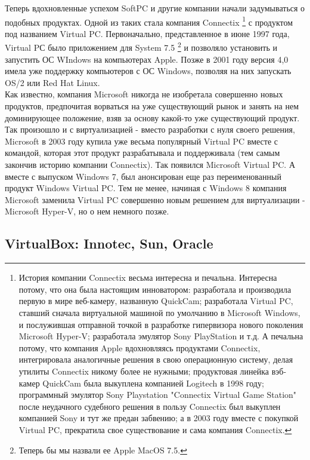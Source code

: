 \documentclass[14pt, a4paper]{article}
\begin{document}
Теперь вдохновленные успехом SoftPC и другие компании начали задумываться о
подобных продуктах. Одной из таких стала компания Connectix \footnote{История компании Connectix весьма интересна и печальна. Интересна потому, что она была
настоящим инноватором: разработала и производила первую в мире веб-камеру, названную
QuickCam; разработала Virtual PC, ставший сначала виртуальной машиной по умолчанию в
Microsoft Windows, и послужившая отправной точкой в разработке гипервизора нового
поколения Microsoft Hyper-V; разработала эмулятор Sony PlayStation и т.д. А печальна потому,
что компания Apple вдохновляясь продуктами Connectix, интегрировала аналогичные решения
в свою операционную систему, делая утилиты Connectix никому более не нужными;
продуктовая линейка вэб-камер QuickCam была выкуплена компанией Logitech в 1998 году;
программный эмулятор Sony Playstation "Connectix Virtual Game Station" после неудачного
судебного решения в пользу Connectix был выкуплен компанией Sony и тут же предан
забвению; а в 2003 году вместе с покупкой Virtual PC, прекратила свое существование и сама
компания Connectix.} с продуктом под названием Virtual PC. Первоначально, 
представленное в июне 1997 года, Virtual PС было приложением для System 7.5 \footnote{Теперь бы мы назвали ее Apple MacOS 7.5.} 
и позволяло установить и запустить ОС WIndows
на компьютерах Apple. Позже в 2001 году версия 4,0 имела уже поддержку
компьютеров с ОС Windows, позволяя на них запускать OS/2 или Red Hat Linux.\\

Как известно, компания Microsoft никогда не изобретала совершенно новых продуктов,
предпочитая ворваться на уже существующий рынок и занять на нем доминирующее
положение, взяв за основу какой-то уже существующий продукт. Так произошло и с
виртуализацией - вместо разработки с нуля своего решения, Microsoft в 2003 году
купила уже весьма популярный Virtual PC вместе с командой, которая этот продукт
разрабатывала и поддерживала (тем самым закончив историю компании Connectix).
Так появился Microsoft Virtual PC. А вместе с выпуском Windows 7, был анонсирован
еще раз переименованный продукт Windows Virtual PC. Тем не менее, начиная с Windows 8 компания Microsoft заменила Virtual PC совершенно новым решением для
виртуализации - Microsoft Hyper-V, но о нем немного позже.

\subsection*{VirtualBox: Innotec, Sun, Oracle}
\end{document}
